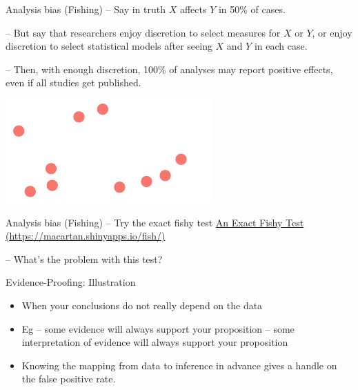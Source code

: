 \documentclass[
  11pt,
  ignorenonframetext,
]{beamer}
\begin{document}
\begin{frame}{Analysis bias (Fishing)}
\protect\hypertarget{analysis-bias-fishing-1}{}
-- Say in truth \(X\) affects \(Y\) in 50\% of cases.

-- But say that researchers enjoy discretion to select measures for
\(X\) or \(Y\), or enjoy discretion to select statistical models after
seeing \(X\) and \(Y\) in each case.

-- Then, with enough discretion, 100\% of analyses may report positive
effects, even if all studies get published.

\includegraphics{0_lectures_files/figure-beamer/unnamed-chunk-536-1.pdf}
\end{frame}

\begin{frame}{Analysis bias (Fishing)}
\protect\hypertarget{analysis-bias-fishing-2}{}
-- Try the exact fishy test
\href{https://macartan.shinyapps.io/fish/}{An Exact Fishy Test
(https://macartan.shinyapps.io/fish/)}

-- What's the problem with this test?
\end{frame}

\begin{frame}{Evidence-Proofing: Illustration}
\protect\hypertarget{evidence-proofing-illustration}{}
\begin{itemize}
\item
  When your conclusions do not really depend on the data
\item
  Eg -- some evidence will always support your proposition -- some
  interpretation of evidence will always support your proposition
\item
  Knowing the mapping from data to inference in advance gives a handle
  on the false positive rate.
\end{itemize}
\end{frame}
\end{document}
